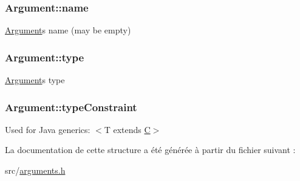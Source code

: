 \subsubsection[{name}]{ Argument\+::name}\label{struct_argument_a334668ce5d1f650c804e69f1bc941a3b}
\hyperlink{struct_argument}{Argument}\textquotesingle{}s name (may be empty) \hypertarget{struct_argument_a1ad588d2b3cc71fe3f74c8272b4ec32e}{}
\subsubsection[{type}]{ Argument\+::type}\label{struct_argument_a1ad588d2b3cc71fe3f74c8272b4ec32e}
\hyperlink{struct_argument}{Argument}\textquotesingle{}s type \hypertarget{struct_argument_aef7bdd7c7d69ebad70624bfebdfa7404}{}
\subsubsection[{type\+Constraint}]{ Argument\+::type\+Constraint}\label{struct_argument_aef7bdd7c7d69ebad70624bfebdfa7404}
Used for Java generics\+: $<$T extends \hyperlink{class_c}{C}$>$ 

La documentation de cette structure a été générée à partir du fichier suivant \+:\begin{DoxyCompactItemize}
\item 
src/\hyperlink{arguments_8h}{arguments.\+h}\end{DoxyCompactItemize}
